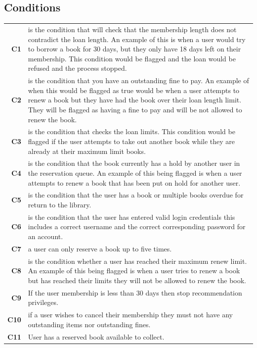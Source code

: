\subsection{Conditions}

\begingroup
\def\arraystretch{1.5}
\begin{longtabu}{>{\bfseries}r X}
    C1 & is the condition that will check that the membership length does not contradict the loan length. An example of this is when a user would try to borrow a book for 30 days, but they only have 18 days left on their membership. This condition would be flagged and the loan would be refused and the process stopped. \\
    C2 & is the condition that you have an outstanding fine to pay. An example of when this would be flagged as true would be when a user attempts to renew a book but they have had the book over their loan length limit. They will be flagged as having a fine to pay and will be not allowed to renew the book. \\
    C3 & is the condition that checks the loan limits. This condition would be flagged if the user attempts to take out another book while they are already at their maximum limit books. \\
    C4 & is the condition that the book currently has a hold by another user in the reservation queue. An example of this being flagged is when a user attempts to renew a book that has been put on hold for another user. \\
    C5 & is the condition that the user has a book or multiple books overdue for return to the library.  \\
    C6 & is the condition that the user has entered valid login credentials this includes a correct username and the correct corresponding password for an account. \\
    C7 & a user can only reserve a book up to five times. \\
    C8 & is the condition whether a user has reached their maximum renew limit. An example of this being flagged is when a user tries to renew a book but has reached their limits they will not be allowed to renew the book. \\
    C9 & If the user membership is less than 30 days then stop recommendation privileges. \\
    C10 & if a user wishes to cancel their membership they must not have any outstanding items nor outstanding fines. \\
    C11 & User has a reserved book available to collect. \\
\end{longtabu}
\endgroup

